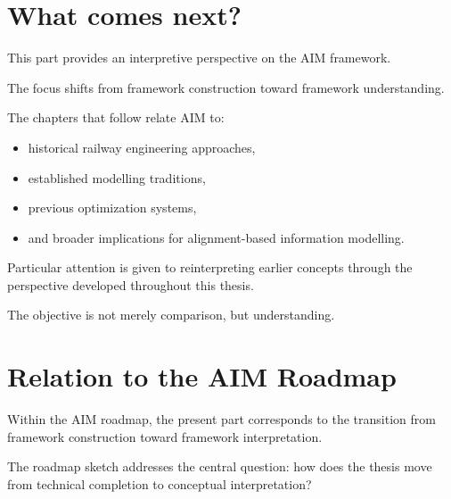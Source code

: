 \section*{What comes next?}

This part provides an interpretive perspective on the AIM framework.

The focus shifts from framework construction toward framework
understanding.

The chapters that follow relate AIM to:
\begin{itemize}
\item historical railway engineering approaches,
\item established modelling traditions,
\item previous optimization systems,
\item and broader implications for alignment-based information
modelling.
\end{itemize}

Particular attention is given to reinterpreting earlier concepts
through the perspective developed throughout this thesis.

The objective is not merely comparison, but understanding.

\section*{Relation to the AIM Roadmap}

Within the AIM roadmap, the present part corresponds to the transition
from framework construction toward framework interpretation.

The roadmap sketch addresses the central question: how does the thesis
move from technical completion to conceptual interpretation?

\begin{center}
\end{center}

